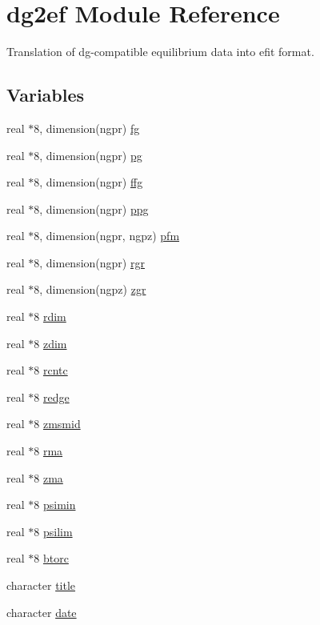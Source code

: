 \hypertarget{namespacedg2ef}{
\section{dg2ef Module Reference}
\label{namespacedg2ef}
}
Translation of dg-compatible equilibrium data into efit format.  


\subsection*{Variables}
\begin{CompactItemize}
\item 
real $\ast$8, dimension(ngpr) \hyperlink{namespacedg2ef_25a2c0596b3c82876975302256bcf013}{fg}
\item 
real $\ast$8, dimension(ngpr) \hyperlink{namespacedg2ef_02f0b7a326715f2d470ae58927ae092f}{pg}
\item 
real $\ast$8, dimension(ngpr) \hyperlink{namespacedg2ef_b703812ea0c4b8c00de2c32fa197438d}{ffg}
\item 
real $\ast$8, dimension(ngpr) \hyperlink{namespacedg2ef_7884246d0a57fda70cd86e66469a5261}{ppg}
\item 
real $\ast$8, dimension(ngpr, ngpz) \hyperlink{namespacedg2ef_b6b952ebcf59b377d1bca5197bf5500e}{pfm}
\item 
real $\ast$8, dimension(ngpr) \hyperlink{namespacedg2ef_23ecb247101b37839cf1b4fa2cf347ac}{rgr}
\item 
real $\ast$8, dimension(ngpz) \hyperlink{namespacedg2ef_ca7ecaca169a88c163404ba3133ea2dc}{zgr}
\item 
real $\ast$8 \hyperlink{namespacedg2ef_8c12d4a3bc4da3c8ad30e8ca3d291645}{rdim}
\item 
real $\ast$8 \hyperlink{namespacedg2ef_33d0967f54bd092c5c377101e002674e}{zdim}
\item 
real $\ast$8 \hyperlink{namespacedg2ef_e49c875203b2860bc38a709d3bf237c3}{rcntc}
\item 
real $\ast$8 \hyperlink{namespacedg2ef_dfe0578ee984fb3f84caf5b872f07942}{redge}
\item 
real $\ast$8 \hyperlink{namespacedg2ef_b259c4be6a732b880895215ef00f313e}{zmsmid}
\item 
real $\ast$8 \hyperlink{namespacedg2ef_945f4fbe9751fc4227640df49fdecb6e}{rma}
\item 
real $\ast$8 \hyperlink{namespacedg2ef_f8a317fbb724f9325e815fe3eb58c4a1}{zma}
\item 
real $\ast$8 \hyperlink{namespacedg2ef_ec5353711f40c34c79b48eaf14c7b436}{psimin}
\item 
real $\ast$8 \hyperlink{namespacedg2ef_8ecc78d90fccb117859adfeb3ecc82dc}{psilim}
\item 
real $\ast$8 \hyperlink{namespacedg2ef_f28ab1aa3e4ed0b74bc1f933efb836bb}{btorc}
\item 
character \hyperlink{namespacedg2ef_b1b73acf07c55965d92e61da63c36537}{title}
\item 
character \hyperlink{namespacedg2ef_83146ae956a47c175883e686881a853d}{date}
\end{CompactItemize}


